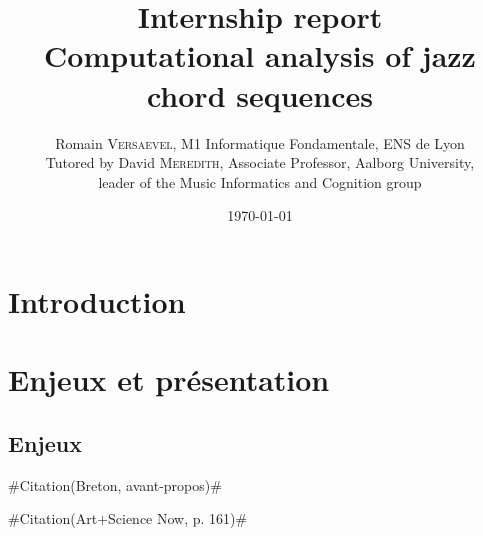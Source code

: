 \documentclass[a4paper,12pt]{article}
\title{\Large Internship report \\ \LARGE Computational analysis of jazz chord sequences}
\author{\normalsize Romain \textsc{Versaevel}, M1 Informatique Fondamentale, ENS de Lyon\\
\normalsize Tutored by David \textsc{Meredith}, Associate Professor, Aalborg University,\\
\normalsize leader of the Music Informatics and Cognition group\\}
\date{\today}
\newcommand{\guill}[1]{«~#1~»}
\newcommand{\zitat}[2]{\#Citation(#2)\#}
\begin{document}
\maketitle
\newpage

\tableofcontents

\newpage

\section{Introduction}

\section{Enjeux et présentation}

\subsection*{Enjeux}

\zitat{L'ordinateur, pendant longtemps, a été la seule vitrine de l'informatique aux yeux du grand public. Chacun sait mieux maintenant que ce domaine comporte de multiples dimensions : les enjeux infustriels, l'univers complexe de la programmation et des langages, les foisonnements des différesnts usages, mais aussi l'affirmation que la logique et une certaine forme de rationalité dont désormais partie de noter culture contemporaine [\dots]
Désormais de très larges publics sont directement concernés par l'informatique. La question qui est aurjoud'hui d'actualité en matières d'informatique est celle de la maîtrise de enjeux que soulève son insertion dans la vie quotidienne. Voilà pourquoi on parle tant de \guill{culture informatique}.}
{Breton, avant-propos}

\zitat{The USA-based curator Christiane Paul organized a pair of related process-oriented shows, both called \emph{CODeDOC}, at the Whitney Museum of American Art in New York (2002) and at Ars Electronica (2003) to explore the conceptual and aesthetic intricacies of code-based art. Artists in each exhibition were given a common challenge for example, to animate three circles connected by lines) and then invited to generate code-based responses. Paul explained her motivations this way in the online catalogue of the Ars Electronica show: \guill{I wanted to raise questions about software art as artistic practice\dots~One intent of the project certainly was to memystify the notion of code as a mysterious, hidden driving force and to reveal the code to the viewer. Among the questions that seemed important to address or clarify were the following: do \emph{signature}, \emph{voice}, and aesthetics of an artist manifest themselbes equally in the written code and its exxecuted results? Will reading the source code enhance the perception of the word? Does it in fact add anything at all or just create an emphasis on \emph{technicalities} that is unnecessary, alienating, and obscures the work?}}
{Art+Science Now, p. 161}
\end{document}
